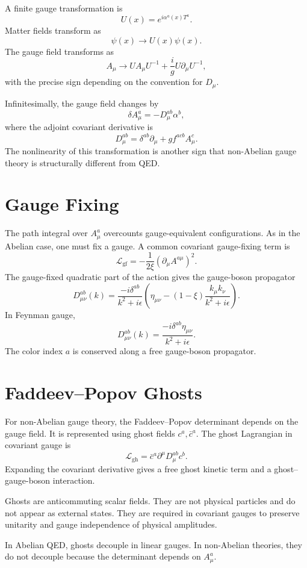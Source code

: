 A finite gauge transformation is
\[
    U(x)=e^{i\alpha^a(x)T^a}.
\]
Matter fields transform as
\[
    \psi(x)\longrightarrow U(x)\psi(x).
\]
The gauge field transforms as
\[
    A_\mu\longrightarrow U A_\mu U^{-1}+\frac{i}{g}U\partial_\mu U^{-1},
\]
with the precise sign depending on the convention for \(D_\mu\).

Infinitesimally, the gauge field changes by
\[
    \delta A_\mu^a = -D_\mu^{ab}\alpha^b,
\]
where the adjoint covariant derivative is
\[
    D_\mu^{ab}=\delta^{ab}\partial_\mu+g f^{acb}A_\mu^c.
\]
The nonlinearity of this transformation is another sign that non-Abelian gauge
theory is structurally different from QED.

\section{Gauge Fixing}

The path integral over \(A_\mu^a\) overcounts gauge-equivalent configurations.
As in the Abelian case, one must fix a gauge. A common covariant gauge-fixing
term is
\[
    \mathcal{L}_{\mathrm{gf}}
    = -\frac{1}{2\xi}(\partial_\mu A^{a\mu})^2.
\]
The gauge-fixed quadratic part of the action gives the gauge-boson propagator
\[
    D_{\mu\nu}^{ab}(k)
    = \frac{-i\delta^{ab}}{k^2+i\epsilon}
      \left(\eta_{\mu\nu}-(1-\xi)\frac{k_\mu k_\nu}{k^2+i\epsilon}\right).
\]
In Feynman gauge,
\[
    D_{\mu\nu}^{ab}(k)=\frac{-i\delta^{ab}\eta_{\mu\nu}}{k^2+i\epsilon}.
\]
The color index \(a\) is conserved along a free gauge-boson propagator.

\section{Faddeev--Popov Ghosts}

For non-Abelian gauge theory, the Faddeev--Popov determinant depends on the
gauge field. It is represented using ghost fields \(c^a,\bar c^a\). The ghost
Lagrangian in covariant gauge is
\[
    \mathcal{L}_{\mathrm{gh}}
    = \bar c^a\partial^\mu D_\mu^{ab}c^b.
\]
Expanding the covariant derivative gives a free ghost kinetic term and a
ghost--gauge-boson interaction.

Ghosts are anticommuting scalar fields. They are not physical particles and do
not appear as external states. They are required in covariant gauges to preserve
unitarity and gauge independence of physical amplitudes.

In Abelian QED, ghosts decouple in linear gauges. In non-Abelian theories, they
do not decouple because the determinant depends on \(A_\mu^a\).

